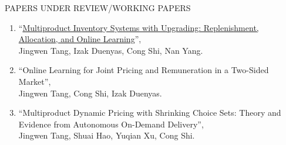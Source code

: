 \documentclass{resume}
\begin{document}
\begin{rSection}{PAPERS UNDER REVIEW/WORKING PAPERS}
\begin{enumerate}

     \item ``\href{https://papers.ssrn.com/sol3/papers.cfm?abstract_id=4781604}{Multiproduct Inventory Systems with Upgrading: Replenishment, Allocation, and Online Learning}'', \\Jingwen Tang, Izak Duenyas, Cong Shi, Nan Yang.


     

    
  
    \item ``Online Learning for Joint Pricing and Remuneration in a Two-Sided Market'', \\ Jingwen Tang, Cong Shi, Izak Duenyas.
	

  
  \item ``Multiproduct Dynamic Pricing with Shrinking Choice Sets: Theory and Evidence from Autonomous On-Demand Delivery'', \\ Jingwen Tang, Shuai Hao, Yuqian Xu, Cong Shi. 
  
\end{enumerate}
\end{rSection}
\end{document}
